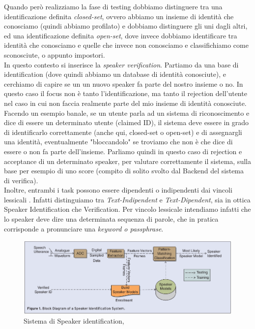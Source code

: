 Quando però realizziamo la fase di testing dobbiamo distinguere tra una identificazione definita \textit{closed-set}, ovvero abbiamo un insieme di identità che conosciamo (quindi abbiamo profilato) 
e dobbiamo distinguere gli uni dagli altri, ed una identificazione definita \textit{open-set}, dove invece dobbiamo identificare tra identità che conosciamo e quelle che invece non conosciamo 
e classifichiamo come sconosciute, o appunto impostori. \\
In questo contesto si inserisce la \textit{speaker verification}. Partiamo da una base di identification (dove quindi abbiamo un database di identità conosciute), e cerchiamo
di capire se un un nuovo speaker fa parte del nostro insieme o no. In questo caso il focus non è tanto l'identificazione, ma tanto il rejection dell'utente nel caso in cui 
non faccia realmente parte del mio insieme di identità conosciute. Facendo un esempio banale, se un utente parla ad un sistema di riconoscimento e dice di essere un determinato utente (claimed ID), 
il sistema deve essere in grado di identificarlo correttamente (anche qui, closed-set o open-set) e di assegnargli una identità, eventualmente "bloccandolo" se troviamo che non è che dice di essere o non fa parte dell'insieme.
Parliamo quindi in questo caso di rejection e acceptance di un determinato speaker, per valutare correttamente il sistema, sulla base per esempio di uno score (compito di solito svolto dal Backend del sistema di verifica). \\

Inoltre, entrambi i task possono essere dipendenti o indipendenti dai vincoli lessicali \cite{tu2022survey}. Infatti distinguiamo tra \textit{Text-Indipendent} e \textit{Text-Dipendent},
sia in ottica Speaker Identification che Verification. Per vincolo lessicale intendiamo infatti che lo speaker deve dire una determinata sequenza di parole, che in pratica
corrisponde a pronunciare una \textit{keyword o passphrase}.

\begin{figure}[ht]
    \centering
    \includegraphics[width=1.0\textwidth]{./ch1/speaker_id.png}
    \caption{Sistema di Speaker identification, \protect\cite{togneri2011overview}}
    \label{fig:speakerschema}
\end{figure}



